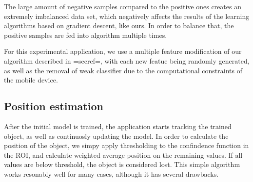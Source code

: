 The large amount of negative samples compared to the positive ones creates an extremely imbalanced data set, which negatively affects the results of the learning algorithms based on gradient descent, like ours. In order to balance that, the positive samples are fed into algorithm multiple times. 

For this experimental application, we use a multiple feature modification of our algorithm described in {{=secref=}}, with each new featue being randomly generated, as well as the removal of weak classifier due to the computational constraints of the mobile device.

\subsection{Position estimation}
After the initial model is trained, the application starts tracking the trained object, as well as continuosly updating the model. In order to calculate the position of the object, we simpy apply thresholding to the confindence function in the ROI, and calculate weighted average position on the remaining values. If all values are below threshold, the object is considered lost. This simple algorithm works resonably well for many cases, although it has several drawbacks.
